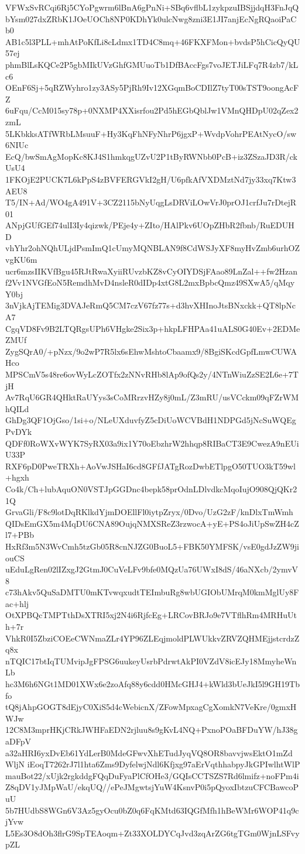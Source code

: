 VFWxSvRCqi6Rj5CYoPgwrm6lBnA6gPnNi+SBq6vflbL1zykpzuIBSjjdqH3FnJqQ
bYsm027dxZRbK1JOeUOCh8NP0KDhYk0ulcNwg8zni3E1JI7anjEcNgRQaoiPaCb0
AB1c5l3PLL+mhAtPoKfLi8cLdmx1TD4C8mq+46FKXFMon+bvdsP5hCicQyQU57ej
phmBlLsKQCe2P5gbMIkUVzGhfGMUuoTb1DfBAccFgs7voJETJiLFq7R4zb7/kLc6
OEnF6Sj+5qRZWyhro1zy3ASy5PjRh9Iv12XGqmBoCDIlZ7tyT00sTST9oongAcFZ
6uFqu/CcM015sy78p+0NXMP4XXisrfou2Pd5hEGbQblJw1VMnQHDpU02qZex2zmL
5LKbkksATfWRbLMsuuF+Hy3KqFhNFyNhrP6jgxP+WvdpVohrPEAtNycO/sw6NIUc
EcQ/bwSmAgMopKc8KJ4S1hmkqgUZvU2P1tByRWNbb0PcB+iz3ZSzaJD3R/ckUsU4
1FKOjE2PUCK7L6kPpS4zBVFERGVkI2gH/U6pfkAfVXDMztNd7jy33xq7Ktw3AEU8
T5/IN+Ad/WO4gA491V+3CZ2115bNyUqgLsDRViLOwVrJ0prOJ1crfJu7rDtejR01
ANpjGUfGEf74ulI3Iy4qizwk/PEje4y+ZIto/HAlPkv6UOpZHbR2fbnb/RuEDUHD
vhYhr2ohNQhULjdPsmImQ1cUmyMQNBLAN9f8CdWSJyXF8myHvZmb6urhOZvgKU6m
ucr6mzsIIKVfBgu45RJtRwaXyiiRUvzbKZ8vCyOIYDSjFAao89LnZal++fw2Hzan
f2Vv1NVGfEoN5RemdhMvD4nsleR0dIDp4xtG8L2mxBpbcQmz49SXwA5/qMqyY0bj
3nVjkAjTEMig3DVAJeRmQ5CM7czV67fz77s+d3hvXHInoJtsBNxckk+QT8lpNcA7
CgqVD8Fv9B2LTQRgsUPh6VHgke2Six3p+hkpLFHPAa41uALS0G40Ev+2EDMeZMUf
ZygSQrA0/+pNzx/9o2wP7R5lx6sEhwMshtoCbaamx9/8BgiSKcdGpfLmwCUWAHco
MPSCmV5s48re6ovWyLcZOTfx2zNNvRHb8lAp9ofQs2y/4NTnWiuZzSE2L6e+7TjH
Av7RqU6GR4QHktRaUYys3sCoMRrzvHZy8j0mL/Z3mRU/usVCckm09qFZrWMhQILd
GhDg3QF1OjGso/1si+o/NLeUXduvfyZ5cDiUoWCVBdH1NDPGd5jNcSuWQEgPvDYk
QDFf0RoWXvWYK7SyRX03a9ix1Y70oEbzhrW2hhqp8RIBaCT3E9CwezA9nEUiU33P
RXF6pD0PweTRXh+AoVwJSHaI6cd8GFfJATgRozDwbETlpgO50TUO3kT59wl+hgxh
Co4k/Ch+lubAquON0VSTJpGGDnc4bepk58prOdnLDlvdkcMqoIujO908QjQKr21Q
GrvaGli/F8c9lotDqRKlkdYjmDOEllFl0iytpZryx/0Dvo/UzG2zF/knDlxTmWmh
QIDsEmGX5m4MqDU6CNA89OujqNMXSReZ3rzwocA+yE+PS4oJiUpSwZH4cZl7+PBb
HxRf3m5N3WvCmh5tzGb05R8cnNJZG0BuoL5+FBK50YMFSK/vsE0gdJzZW9jiouCS
uEduLgRen02lIZxgJ2GtmJ0CuVeLFv9bfe0MQzUa76UWxI8dS/46aNXcb/2ymvV8
c73hAkv5QuSaDMTU0mKTvwqxudtTEImbuRg8wbUGIObUMrqM0kmMglUy8Fac+hlj
OtXPBQcTMPTthDsXTRI5xj2N4i6RjfcEg+LRCovBRJo9e7VTflhRm4MRHuUth+7r
VhkR0I5ZbziCOEeCWNmaZLr4YP96ZLEqjmoldPLWUkkvZRVZQHMEjjstcrdzZq8x
nTQIC17btIqTUMvipJgFPSG6uukeyUsrbPdrwtAkPI0VZdV8icEJy18MmyheWnLb
hc3M6h6NGt1MD01XWx6e2zoAfq88y6cdd0HMcGHJ4+kWld3bUeJkI5l9GH19Tbfo
tQ8jAhpGOGT8dEjyC0XiS5d4cWebicnX/ZFowMpxagCgXomkN7VeKre/0gmxHWJw
12C8M3mprHKjCRkJWHFaEDN2rjluu8s9gKvL4NQ+PxnoPOaBFDuYW/hJ38gaDFpV
a32aHRI6yxDvEb61YdLerB0MdeGFwvXhETudJyqVQ8OR8bavvjwsEktO1mZdWljN
iEoqT7262rJ7l1hta6Zms9DyfelwjNdl6Kfjxg97aErVqthhabpyJkGPIwlhtWlP
mauBot22/xUjk2rgkddgFQqDuFyaPlCfOHe3/GQIsCCTSZS7Rd6lmifz+noFPm4i
Z8qDV1yJMpWaU/ekqUQ//ePeJMgwtsjYuW4KsnvP0i5pQyoxIbtzuCFCBawcoPuU
5b7HUdbS8WGn6V3Az5gyOcu0bZ0q6FqKMtd63IQGfMfh1hBeWMr6WOP41q9cjYvw
L5Es3O8dOh3flrG9SpTEAoqm+Zt33XOLDYCqJvd3zqArZG6tgTGm0WjnLSFvypZL
